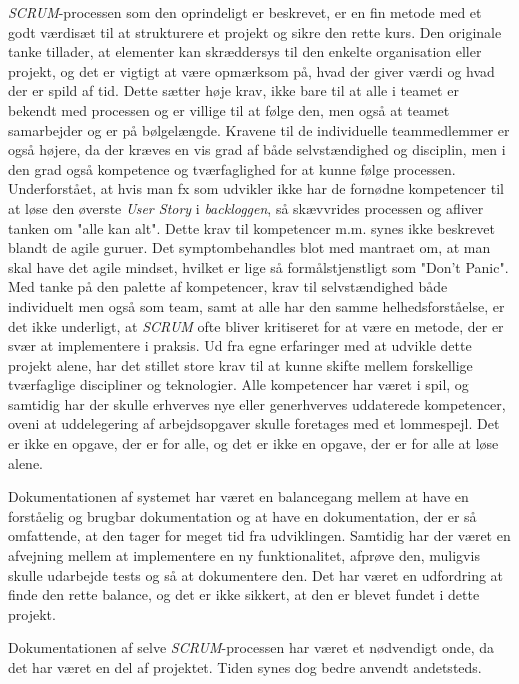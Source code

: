 \emph{SCRUM}-processen som den oprindeligt er beskrevet, er en fin metode med et godt værdisæt til at strukturere et projekt og sikre den rette kurs.
Den originale tanke tillader, at elementer kan skræddersys til den enkelte organisation eller projekt, og det er vigtigt at være opmærksom på, hvad der giver værdi og hvad der er spild af tid.
Dette sætter høje krav, ikke bare til at alle i teamet er bekendt med processen og er villige til at følge den, men også at teamet samarbejder og er på bølgelængde.
Kravene til de individuelle teammedlemmer er også højere, da der kræves en vis grad af både selvstændighed og disciplin, men i den grad også kompetence og tværfaglighed for at kunne følge processen.
Underforstået, at hvis man fx som udvikler ikke har de fornødne kompetencer til at løse den øverste \emph{User Story} i \emph{backloggen}, så skævvrides processen og afliver tanken om "alle kan alt". 
Dette krav til kompetencer m.m. synes ikke beskrevet blandt de agile guruer. Det symptombehandles blot med mantraet om, at man skal have det agile mindset, hvilket er lige så formålstjenstligt som "Don't Panic".
Med tanke på den palette af kompetencer, krav til selvstændighed både individuelt men også som team, samt at alle har den samme helhedsforståelse, er det ikke underligt, at \emph{SCRUM} ofte bliver kritiseret for at være en metode, der er svær at implementere i praksis.
Ud fra egne erfaringer med at udvikle dette projekt alene, har det stillet store krav til at kunne skifte mellem forskellige tværfaglige discipliner og teknologier. 
Alle kompetencer har været i spil, og samtidig har der skulle erhverves nye eller generhverves uddaterede kompetencer, oveni at uddelegering af arbejdsopgaver skulle foretages med et lommespejl.
Det er ikke en opgave, der er for alle, og det er ikke en opgave, der er for alle at løse alene.

Dokumentationen af systemet har været en balancegang mellem at have en forståelig og brugbar dokumentation og at have en dokumentation, der er så omfattende, at den tager for meget tid fra udviklingen.
Samtidig har der været en afvejning mellem at implementere en ny funktionalitet, afprøve den, muligvis skulle udarbejde tests og så at dokumentere den.
Det har været en udfordring at finde den rette balance, og det er ikke sikkert, at den er blevet fundet i dette projekt. 

Dokumentationen af selve \emph{SCRUM}-processen har været et nødvendigt onde, da det har været en del af projektet. Tiden synes dog bedre anvendt andetsteds.

